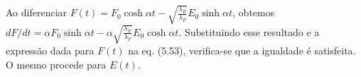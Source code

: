 Ao diferenciar $F(t)=F_{0}\cosh\alpha t-\sqrt{\frac{\lambda_E}{\lambda_F}}E_{0}\sinh\alpha t$, obtemos $dF/dt=\alpha F_{0}\sinh\alpha t-\alpha\sqrt{\frac{\lambda_E}{\lambda_F}}E_{0}\cosh\alpha t$. Substituindo esse resultado e a expressão dada para $F(t)$ na eq. (5.53), verifica-se que a igualdade é satisfeita. O mesmo procede para $E(t)$. 